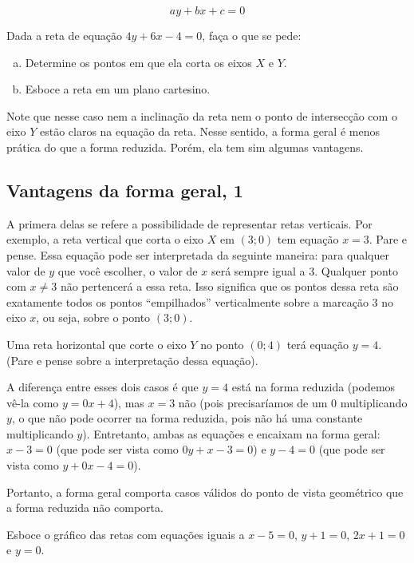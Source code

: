 \documentclass[main_estudante.tex]{subfiles}
\begin{document}
$$ay+bx+c=0$$

\begin{questao}
Dada a reta de equação $4y+6x-4=0$, faça o que se pede:
\begin{enumerate}[a)]
\item Determine os pontos em que ela corta os eixos $X$ e $Y$.
\item Esboce a reta em um plano cartesino.
\end{enumerate} 
\end{questao}

Note que nesse caso nem a inclinação da reta nem o ponto de intersecção com o eixo $Y$ estão claros na equação da reta. Nesse sentido, a forma geral é menos prática do que a forma reduzida. Porém, ela tem sim algumas vantagens.

\subsection*{Vantagens da forma geral, 1}

A primera delas se refere a possibilidade de representar retas verticais. Por exemplo, a reta vertical que corta o eixo $X$ em $(3;0)$ tem equação $x=3$. Pare e pense. Essa equação pode ser interpretada da seguinte maneira: para qualquer valor de $y$ que você escolher, o valor de $x$ será sempre igual a $3$. Qualquer ponto com $x\neq3$ não pertencerá a essa reta. Isso significa que os pontos dessa reta são exatamente todos os pontos ``empilhados'' verticalmente sobre a marcação $3$ no eixo $x$, ou seja, sobre o ponto $(3;0)$.

Uma reta horizontal que corte o eixo $Y$ no ponto $(0;4)$ terá equação $y=4$. (Pare e pense sobre a interpretação dessa equação).

A diferença entre esses dois casos é que $y=4$ está na forma reduzida (podemos vê-la como $y=0x+4$), mas $x=3$ não (pois precisaríamos de um $0$ multiplicando $y$, o que não pode ocorrer na forma reduzida, pois não há uma constante multiplicando $y$). Entretanto, ambas as equações e encaixam na forma geral: $x-3=0$ (que pode ser vista como $0y+x-3=0$) e $y-4=0$ (que pode ser vista como $y+0x-4=0$).

Portanto, a forma geral comporta casos válidos do ponto de vista geométrico que a forma reduzida não comporta.

\begin{questao}
Esboce o gráfico das retas com equações iguais a $x-5=0$, $y+1=0$, $2x+1=0$ e $y=0$.
\end{questao}
\end{document}
